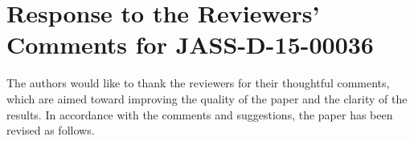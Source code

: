 \documentclass[11pt]{article}
\begin{document}

\section*{Response to the Reviewers' Comments for JASS-D-15-00036}

The authors would like to thank the reviewers for their thoughtful comments, which are aimed toward improving the quality of the paper and the clarity of the results. In accordance with the comments and suggestions, the paper has been revised as follows.

\end{document}
